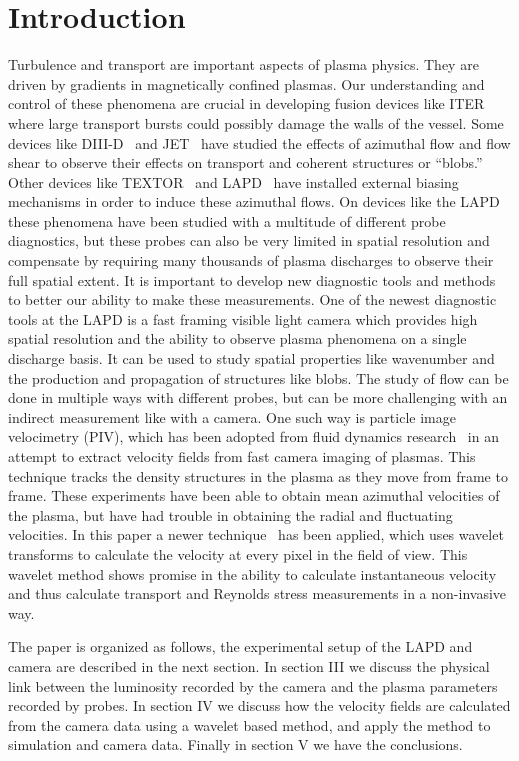 \documentclass[%
 reprint,
 amsmath,amssymb,
 aps,
]{revtex4-1}
\begin{document}
\section{\label{sec:level1}Introduction}
Turbulence and transport are important aspects of plasma physics. They are driven by gradients in magnetically confined plasmas. Our understanding and control of these phenomena are crucial in developing fusion devices like ITER where large transport bursts could possibly damage the walls of the vessel. Some devices like DIII-D~\cite{mckee03} and JET~\cite{xu09} have studied the effects of azimuthal flow and flow shear to observe their effects on transport and coherent structures or “blobs.” Other devices like TEXTOR~\cite{jachmich98} and LAPD~\cite{Carter09,schaffner12,schaffner13} have installed external biasing mechanisms in order to induce these azimuthal flows. On devices like the LAPD these phenomena have been studied with a multitude of different probe diagnostics, but these probes can also be very limited in spatial resolution and compensate by requiring many thousands of plasma discharges to observe their full spatial extent. It is important to develop new diagnostic tools and methods to better our ability to make these measurements. One of the newest diagnostic tools at the LAPD is a fast framing visible light camera which provides high spatial resolution and the ability to observe plasma phenomena on a single discharge basis. It can be used to study spatial properties like wavenumber and the production and propagation of structures like blobs. The study of flow can be done in multiple ways with different probes, but can be more challenging with an indirect measurement like with a camera. One such way is particle image velocimetry (PIV), which has been adopted from fluid dynamics research~\cite{oldenburger10} in an attempt to extract velocity fields from fast camera imaging of plasmas. This technique tracks the density structures in the plasma as they move from frame to frame. These experiments have been able to obtain mean azimuthal velocities of the plasma, but have had trouble in obtaining the radial and fluctuating velocities. In this paper a newer technique~\cite{chaston10} has been applied, which uses wavelet transforms to calculate the velocity at every pixel in the field of view. This wavelet method shows promise in the ability to calculate instantaneous velocity and thus calculate transport and Reynolds stress measurements in a non-invasive way.

The paper is organized as follows, the experimental setup of the LAPD and camera are described in the next section. In section III we discuss the physical link between the luminosity recorded by the camera and the plasma parameters recorded by probes. In section IV we discuss how the velocity fields are calculated from the camera data using a wavelet based method, and apply the method to simulation and camera data. Finally in section V we have the conclusions.
\end{document}
